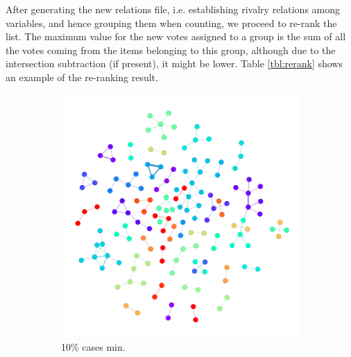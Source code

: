 After generating the new relations file, i.e. establishing rivalry relations among variables, and hence grouping them when counting, we proceed to re-rank the list. The maximum value for the new votes assigned to a group is the sum of all the votes coming from the items belonging to this group, although due to the intersection subtraction (if present), it might be lower. Table \ref{tbl:rerank} shows an example of the re-ranking result.
\\
\begin{figure}[!h]
    \centering
	\begin{subfigure}[b]{0.30\linewidth}
		\includegraphics[width=\linewidth]{Minor Thesis/figures/graphs/main/g95102028.png}
		\caption{10\% cases min.}
	\end{subfigure}
	\hfill
	\begin{subfigure}[b]{0.30\linewidth}

\end{subfigure}
\end{figure}
